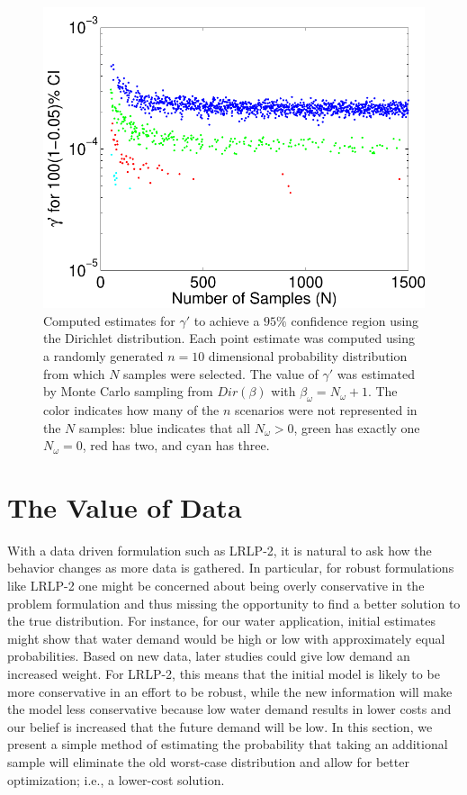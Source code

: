 \documentclass[11pt]{article}
\begin{document}
\begin{figure}
	\centering
	\includegraphics[width=.6\textwidth]{images/gammaprime_diff_samples_dim_10}
	\caption{
		Computed estimates for $\gamma'$ to achieve a $95\%$ confidence region using the Dirichlet distribution.
		Each point estimate was computed using a randomly generated $n=10$ dimensional probability distribution from which $N$ samples were selected.
		The value of $\gamma'$ was estimated by Monte Carlo sampling from $Dir(\beta)$ with $\beta_\omega = N_\omega + 1$.
		The color indicates how many of the $n$ scenarios were not represented in the $N$ samples: blue indicates that all $N_\omega > 0$, green has exactly one $N_\omega = 0$, red has two, and cyan has three.
	}
	\label{fig:gammaprime_by_sample}
\end{figure}


\section{The Value of Data} \label{sec:value}

With a data driven formulation such as LRLP-2, it is natural to ask how the behavior changes as more data is gathered.
In particular, for robust formulations like LRLP-2 one might be concerned about being overly conservative in the problem formulation and thus missing the opportunity to find a better solution to the true distribution.
For instance, for our water application, initial estimates might show that water demand would be high or low with approximately equal probabilities. 
Based on new data, later studies could give low demand an increased weight.  
For LRLP-2, this means that the initial model is likely to be more conservative in an effort to be robust, while the new information will make the model less conservative because low water demand results in lower costs and our belief is increased that the future demand will be low.  
In this section, we present a simple method of estimating the probability that taking an additional sample will eliminate the old worst-case distribution and allow for better optimization; i.e., a lower-cost solution.
\end{document}
